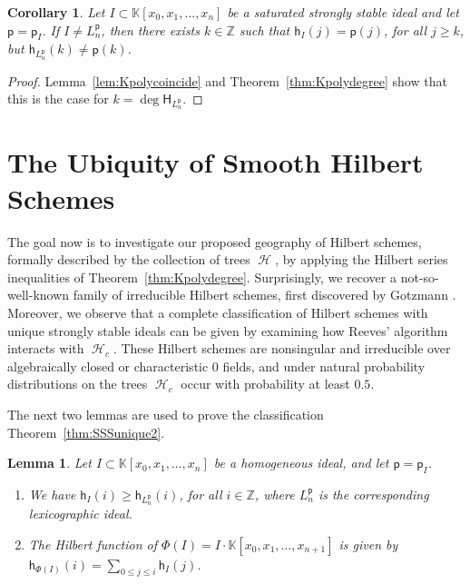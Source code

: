 \documentclass[12pt]{amsart}%
\newtheorem{lemma}[theorem]{Lemma}
\newtheorem{corollary}[theorem]{Corollary}
\theoremstyle{definition}%
\DeclareMathOperator{\hilbtree}{\mathscr{H}}%
\newcommand{\hf}{\mathsf{h}}%
\newcommand{\hp}{\mathsf{p}}%
\newcommand{\lift}{\Phi}%
\newcommand{\hs}{\mathsf{H}}%
\newcommand{\kk}{\mathbb{K}}%
\newcommand{\ZZ}{\mathbb{Z}}%
\begin{document}
\begin{corollary}
  \label{cor:Kpolydegree}
  Let $I \subset \kk[x_0, x_1, \dotsc , x_n]$ be a saturated strongly
  stable ideal and let $\hp = \hp_I$.  If $I \ne L^{\hp}_n$, then
  there exists $k \in \ZZ$ such that $\hf_I(j) = \hp(j)$, for all $j
  \ge k$, but $\hf_{L^{\hp}_n}(k) \ne \hp(k)$.
\end{corollary}

\begin{proof}
  Lemma~\ref{lem:Kpolycoincide} and Theorem~\ref{thm:Kpolydegree} show
  that this is the case for $k = \deg \hs_{L^{\hp}_n}$.
\end{proof}




\section{The Ubiquity of Smooth Hilbert Schemes}
\label{ch:Hilbertirred}

The goal now is to investigate our proposed geography of Hilbert
schemes, formally described by the collection of trees $\hilbtree$, by
applying the Hilbert series inequalities of
Theorem~\ref{thm:Kpolydegree}.  Surprisingly, we recover a
not-so-well-known family of irreducible Hilbert schemes, first
discovered by Gotzmann \cite[Proposition~1]{Gotzmann--1989}.
Moreover, we observe that a complete classification of Hilbert schemes
with unique strongly stable ideals can be given by examining how
Reeves' algorithm interacts with $\hilbtree_c$.  These Hilbert schemes
are nonsingular and irreducible over algebraically closed or
characteristic $0$ fields, and under natural probability distributions
on the trees $\hilbtree_c$ occur with probability at least $0.5$.

The next two lemmas are used to prove the classification
Theorem~\ref{thm:SSSunique2}.

\begin{lemma}
  \label{lem:Hfunctionineq}
  Let $I \subset \kk[x_0, x_1, \dotsc, x_n]$ be a homogeneous ideal,
  and let $\hp = \hp_I$.
  \begin{enumerate}
  \item We have $\hf_I(i) \ge \hf_{L^{\hp}_n}(i)$, for all $i \in
    \ZZ$, where $L^{\hp}_n$ is the corresponding lexicographic ideal.

  \item The Hilbert function of $\lift ( I ) = I \cdot \kk[x_0, x_1,
    \dotsc, x_{n+1}]$ is given by $\hf_{\lift ( I )}(i) = \sum_{0 \le
    j \le i} \hf_I(j)$.
  \end{enumerate}
\end{lemma}
\end{document}
